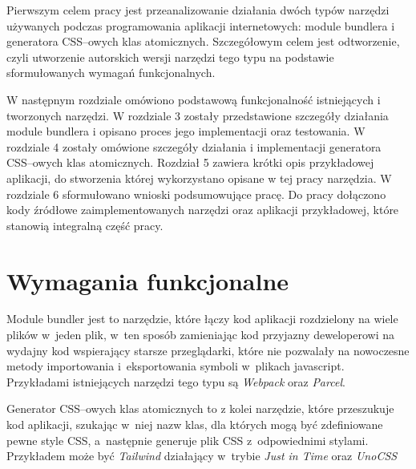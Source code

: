 \documentclass{SGGW-thesis}
\begin{document}
Pierwszym celem pracy jest przeanalizowanie działania dwóch typów narzędzi używanych podczas programowania aplikacji internetowych: module bundlera i generatora CSS--owych klas atomicznych. Szczegółowym celem jest odtworzenie, czyli utworzenie autorskich wersji narzędzi tego typu na podstawie sformułowanych wymagań funkcjonalnych.

W następnym rozdziale omówiono podstawową funkcjonalność istniejących i tworzonych narzędzi. W rozdziale 3 zostały przedstawione szczegóły działania module bundlera i opisano proces jego implementacji oraz testowania. W rozdziale 4 zostały omówione szczegóły działania i implementacji generatora CSS--owych klas atomicznych. Rozdział 5 zawiera krótki opis przykładowej aplikacji, do stworzenia której wykorzystano opisane w tej pracy narzędzia. W rozdziale 6 sformułowano wnioski podsumowujące pracę. Do pracy dołączono kody źródłowe zaimplementowanych narzędzi oraz aplikacji przykładowej, które stanowią integralną część pracy.

\chapter{Wymagania funkcjonalne}

Module bundler jest to narzędzie, które łączy kod aplikacji rozdzielony na wiele plików w~jeden plik, w~ten sposób zamieniając kod przyjazny deweloperowi na wydajny kod wspierający starsze przeglądarki, które nie pozwalały na nowoczesne metody importowania i~eksportowania symboli w~plikach javascript. Przykładami istniejących narzędzi tego typu są \emph{Webpack} oraz \emph{Parcel}.

Generator CSS--owych klas atomicznych to z kolei narzędzie, które przeszukuje kod aplikacji, szukając w~niej nazw klas, dla których mogą być zdefiniowane pewne style CSS, a~następnie generuje plik CSS z~odpowiednimi stylami. Przykładem może być \emph{Tailwind\cite{Tailwind_jit}} działający w~trybie \emph{Just in Time} oraz \emph{UnoCSS\cite{unocss}}
\end{document}

